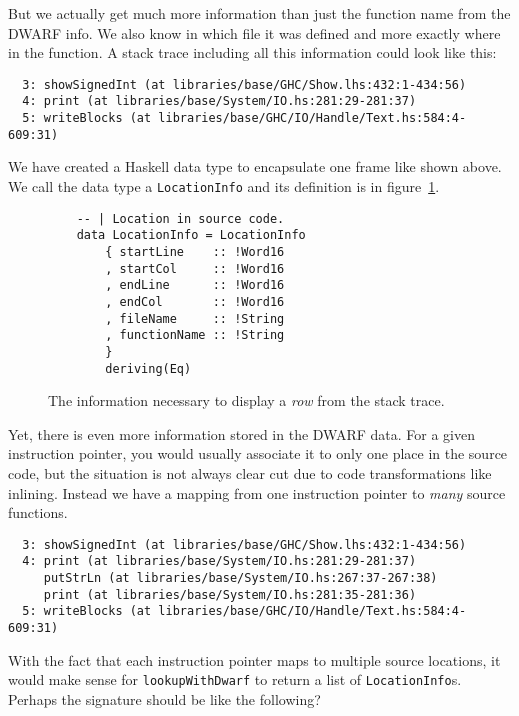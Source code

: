 But we actually get much more information than just the function name
from the DWARF info. We also know in which file it was defined and more
exactly where in the function. A stack trace including all this
information could look like this:

\begin{verbatim}
  3: showSignedInt (at libraries/base/GHC/Show.lhs:432:1-434:56)
  4: print (at libraries/base/System/IO.hs:281:29-281:37)
  5: writeBlocks (at libraries/base/GHC/IO/Handle/Text.hs:584:4-609:31)
\end{verbatim}

We have created a Haskell data type to encapsulate one frame like shown
above. We call the data type a \texttt{LocationInfo} and its definition
is in figure~\ref{fig:location_info}.

\begin{figure}
\begin{mdframed}
  \begin{verbatim}
    -- | Location in source code.
    data LocationInfo = LocationInfo
        { startLine    :: !Word16
        , startCol     :: !Word16
        , endLine      :: !Word16
        , endCol       :: !Word16
        , fileName     :: !String
        , functionName :: !String
        }
        deriving(Eq)
  \end{verbatim}
  \caption{The information necessary to display a \emph{row} from the stack
    trace.}
  \label{fig:location_info}
\end{mdframed}
\end{figure}

Yet, there is even more information stored in the DWARF data. For a
given instruction pointer, you would usually associate it to only one
place in the source code, but the situation is not always clear cut due
to code transformations like inlining. Instead we have a
mapping from one instruction pointer to \emph{many} source functions.

\begin{verbatim}
  3: showSignedInt (at libraries/base/GHC/Show.lhs:432:1-434:56)
  4: print (at libraries/base/System/IO.hs:281:29-281:37)
     putStrLn (at libraries/base/System/IO.hs:267:37-267:38)
     print (at libraries/base/System/IO.hs:281:35-281:36)
  5: writeBlocks (at libraries/base/GHC/IO/Handle/Text.hs:584:4-609:31)
\end{verbatim}

With the fact that each instruction pointer maps to multiple
source locations, it would make sense for \texttt{lookupWithDwarf} to
return a list of \texttt{LocationInfo}s.
Perhaps the signature should be like the following?

